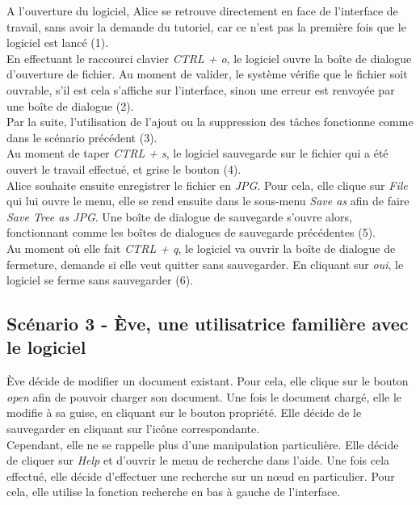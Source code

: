 \documentclass[12pt, a4paper]{article}
\begin{document}
A l'ouverture du logiciel, Alice se retrouve directement en face de l'interface de travail, sans avoir la demande du tutoriel, car ce n'est pas la première fois que le logiciel est lancé (1).\\


En effectuant le raccourci clavier \emph{CTRL + o}, le logiciel ouvre la boîte de dialogue d'ouverture de fichier. Au moment de valider, le système vérifie que le fichier soit ouvrable, s’il est cela s'affiche sur l'interface, sinon une erreur est renvoyée par une boîte de dialogue (2).\\


Par la suite, l'utilisation de l'ajout ou la suppression des tâches fonctionne comme dans le scénario précédent (3).\\


Au moment de taper \emph{CTRL + s}, le logiciel sauvegarde sur le fichier qui a été ouvert le travail effectué, et grise le bouton (4). \\


Alice souhaite ensuite enregistrer le fichier en \emph{JPG}. Pour cela, elle clique sur \emph{File} qui lui ouvre le menu, elle se rend ensuite dans le sous-menu \emph{Save as} afin de faire \emph{Save Tree as JPG}. Une boîte de dialogue de sauvegarde s'ouvre alors, fonctionnant comme les boîtes de dialogues de sauvegarde précédentes (5).\\


Au moment où elle fait \emph{CTRL + q}, le logiciel va ouvrir la boîte de dialogue de fermeture, demande si elle veut quitter sans sauvegarder. En cliquant sur \emph{oui}, le logiciel se ferme sans sauvegarder (6).\newpage


\subsection{Scénario 3 - Ève, une utilisatrice familière avec le logiciel}


Ève décide de modifier un document existant. Pour cela, elle clique sur le bouton \emph{open} afin de pouvoir charger son document. Une fois le document chargé, elle le modifie à sa guise, en cliquant sur le bouton propriété. Elle décide de le sauvegarder en cliquant sur l'icône correspondante.\\


Cependant, elle ne se rappelle plus d'une manipulation particulière. Elle décide de cliquer sur \emph{Help} et d'ouvrir le menu de recherche dans l'aide. Une fois cela effectué, elle décide d’effectuer une recherche sur un nœud en particulier. Pour cela, elle utilise la fonction recherche en bas à gauche de l'interface. \\
\end{document}
